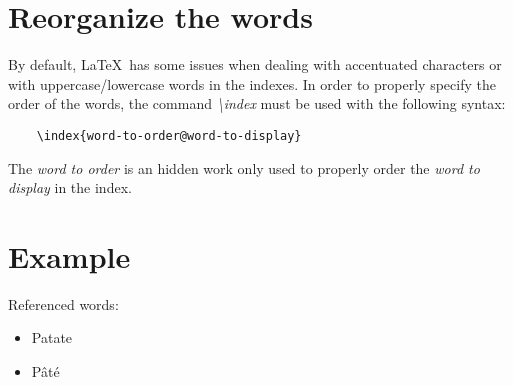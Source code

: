 \documentclass{article}
\begin{document}
	
\section*{Reorganize the words}
	
By default, \LaTeX\ has some issues when dealing with accentuated characters or with uppercase/lowercase words in the indexes. In order to properly specify the order of the words, the command \emph{\textbackslash index} must be used with the following syntax:

\begin{verbatim}
	\index{word-to-order@word-to-display}
\end{verbatim}

The \emph{word to order} is an hidden work only used to properly order the \emph{word to display} in the index.

\section*{Example}

Referenced words:

\begin{itemize}
	\item Patate 
	\item Pâté 
\end{itemize}


\printindex
\end{document}
